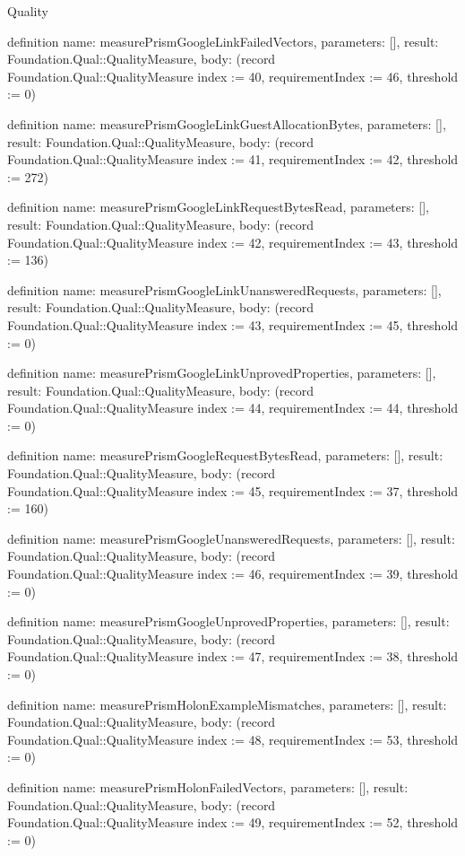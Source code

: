 \begin{lexlean}{Quality}
\begin{semanticmodule}
definition{
  name: measurePrismGoogleLinkFailedVectors,
  parameters: [],
  result: Foundation.Qual::QualityMeasure,
  body: (record Foundation.Qual::QualityMeasure {index := 40, requirementIndex := 46, threshold := 0})
}

definition{
  name: measurePrismGoogleLinkGuestAllocationBytes,
  parameters: [],
  result: Foundation.Qual::QualityMeasure,
  body: (record Foundation.Qual::QualityMeasure {index := 41, requirementIndex := 42, threshold := 272})
}

definition{
  name: measurePrismGoogleLinkRequestBytesRead,
  parameters: [],
  result: Foundation.Qual::QualityMeasure,
  body: (record Foundation.Qual::QualityMeasure {index := 42, requirementIndex := 43, threshold := 136})
}

definition{
  name: measurePrismGoogleLinkUnansweredRequests,
  parameters: [],
  result: Foundation.Qual::QualityMeasure,
  body: (record Foundation.Qual::QualityMeasure {index := 43, requirementIndex := 45, threshold := 0})
}

definition{
  name: measurePrismGoogleLinkUnprovedProperties,
  parameters: [],
  result: Foundation.Qual::QualityMeasure,
  body: (record Foundation.Qual::QualityMeasure {index := 44, requirementIndex := 44, threshold := 0})
}

definition{
  name: measurePrismGoogleRequestBytesRead,
  parameters: [],
  result: Foundation.Qual::QualityMeasure,
  body: (record Foundation.Qual::QualityMeasure {index := 45, requirementIndex := 37, threshold := 160})
}

definition{
  name: measurePrismGoogleUnansweredRequests,
  parameters: [],
  result: Foundation.Qual::QualityMeasure,
  body: (record Foundation.Qual::QualityMeasure {index := 46, requirementIndex := 39, threshold := 0})
}

definition{
  name: measurePrismGoogleUnprovedProperties,
  parameters: [],
  result: Foundation.Qual::QualityMeasure,
  body: (record Foundation.Qual::QualityMeasure {index := 47, requirementIndex := 38, threshold := 0})
}

definition{
  name: measurePrismHolonExampleMismatches,
  parameters: [],
  result: Foundation.Qual::QualityMeasure,
  body: (record Foundation.Qual::QualityMeasure {index := 48, requirementIndex := 53, threshold := 0})
}

definition{
  name: measurePrismHolonFailedVectors,
  parameters: [],
  result: Foundation.Qual::QualityMeasure,
  body: (record Foundation.Qual::QualityMeasure {index := 49, requirementIndex := 52, threshold := 0})
}


\end{semanticmodule}
\end{lexlean}

